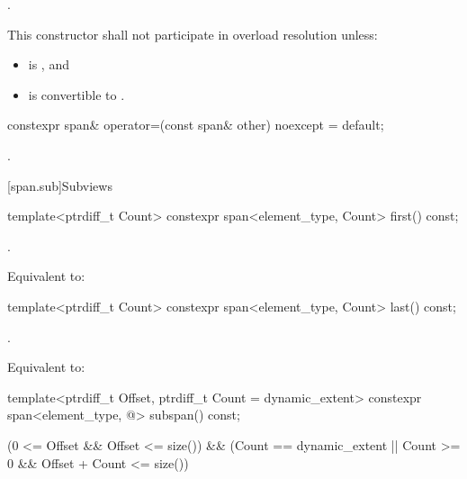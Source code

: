 \begin{codeblock}
\begin{codeblock}
\begin{codeblock}
\begin{itemdescr}
\pnum
\postconditions
{}.

\pnum
\remarks
This constructor shall not participate in overload resolution unless:
\begin{itemize}
\item {} is , and
\item {} is convertible to .
\end{itemize}
\end{itemdescr}

%
\begin{itemdecl}
constexpr span& operator=(const span& other) noexcept = default;
\end{itemdecl}
\begin{itemdescr}
\pnum
\postconditions
{}.
\end{itemdescr}

[span.sub]{Subviews}

%
\begin{itemdecl}
template<ptrdiff_t Count> constexpr span<element_type, Count> first() const;
\end{itemdecl}
\begin{itemdescr}
\pnum
\requires
{}.

\pnum
\effects
Equivalent to: 
\end{itemdescr}

%
\begin{itemdecl}
template<ptrdiff_t Count> constexpr span<element_type, Count> last() const;
\end{itemdecl}
\begin{itemdescr}
\pnum
\requires
{}.

\pnum
\effects
Equivalent to: 
\end{itemdescr}

%
\begin{itemdecl}
template<ptrdiff_t Offset, ptrdiff_t Count = dynamic_extent>
  constexpr span<element_type, @\seebelow@> subspan() const;
\end{itemdecl}
\begin{itemdescr}
\pnum
\requires
\begin{codeblock}
(0 <= Offset && Offset <= size())
&& (Count == dynamic_extent || Count >= 0 && Offset + Count <= size())
\end{codeblock}


\end{itemdescr}
\end{codeblock}
\end{codeblock}
\end{codeblock}
